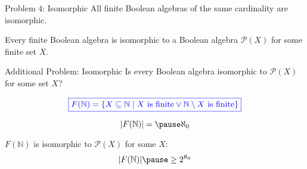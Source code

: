 
\begin{frame}{}
  \begin{exampleblock}{Problem $4$: Isomorphic}
    All finite Boolean algebras of the same cardinality are isomorphic.
  \end{exampleblock}
  
  \pause
  \vspace{0.80cm}
  \begin{theorem}
    Every finite Boolean algebra is isomorphic to a Boolean algebra $\mathcal{P}(X)$ for some finite set $X$.
  \end{theorem}
  
\end{frame}

\begin{frame}{}
  \begin{exampleblock}{Additional Problem: Isomorphic}
    Is every Boolean algebra isomorphic to $\mathcal{P}(X)$ for some set $X$?
  \end{exampleblock}
  
  \pause
  \begin{center}
  \end{center}
  \[
    \textcolor{blue}{\boxed{F(\mathbb{N}) = \{X \subseteq \mathbb{N} \mid X \text{ is finite} \lor \mathbb{N} \setminus X \text{ is finite}\}}}
  \]
  
  \pause
  \[
    |F(\mathbb{N})| = \pause \aleph_{0}
  \]
  
  \pause
  \vspace{-0.50cm}
  \begin{center}
     $F(\mathbb{N})$ is isomorphic to $\mathcal{P}(X)$ for some $X$:
    \[
      |F(\mathbb{N})| \pause \ge 2^{\aleph_{0}}
    \]
  \end{center}
\end{frame}
